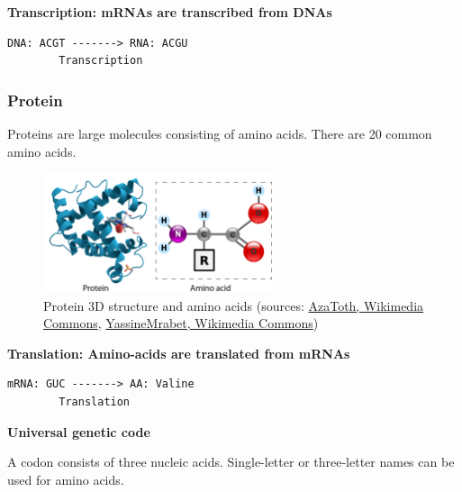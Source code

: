\noindent \textbf{Transcription: mRNAs are transcribed from DNAs}

\begin{verbatim}
DNA: ACGT -------> RNA: ACGU
        Transcription
\end{verbatim}

%
%
\subsubsection*{Protein}

Proteins are large molecules consisting of amino acids. There are 20 common amino acids.
 
\begin{figure}[H]
  \centering
      \includegraphics[width=0.6\textwidth]{fig01/protein_and_amino_acid.png}
  \caption{Protein 3D structure and amino acids \newline (sources: \href{https://en.wikipedia.org/wiki/Protein\#/media/File:Myoglobin.png}{AzaToth, Wikimedia Commons}, \href{https://en.wikipedia.org/wiki/Amino_acid\#/media/File:AminoAcidball.svg}{YassineMrabet, Wikimedia Commons})}
\end{figure}

\noindent \textbf{Translation: Amino-acids are translated from mRNAs}

\begin{verbatim}
mRNA: GUC -------> AA: Valine
        Translation
\end{verbatim}

\newpage 

\noindent \textbf{Universal genetic code}

\noindent A codon consists of three nucleic acids. Single-letter or three-letter names can be used for amino acids.

